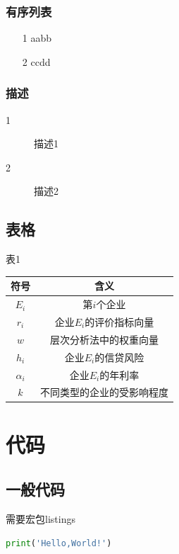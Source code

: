 \documentclass[utf8]{ctexart}
\begin{document}
\subsubsection{有序列表}
\begin{enumerate}
  \item[1] aabb
  \item[2] ccdd 
\end{enumerate}

\subsubsection{描述}
\begin{description}
  \item[1] 描述1
  \item[2] 描述2 
\end{description}

\subsection{表格}
\begin{table}[htbp]
  \begin{center}
  
  \setlength\tabcolsep{40pt} %
  表1
  
  \renewcommand{\arraystretch}{1.4} %
  \begin{tabular}{c c} %
  \hline %
  符号     & 含义                  \\ \hline
  $E_i$ & 第$i$个企业     \\  
  $r_i$      & 企业$E_i$的评价指标向量      \\  
  $w$      & 层次分析法中的权重向量        \\  
  $h_i$      & 企业$E_i$的信贷风险 \\ 
  $\alpha_i$      &企业$E_i$的年利率         \\ 
  $k$      & 不同类型的企业的受影响程度    \\ 
   \hline
  \end{tabular}
  
  \end{center}
\end{table}
\newpage %

\section{代码}
\subsection{一般代码}
需要宏包listings
\begin{lstlisting}[language=python]
  print('Hello,World!')
\end{lstlisting}
\end{document}
